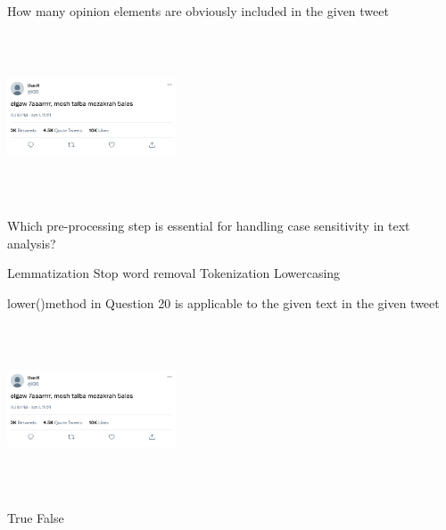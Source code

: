 \documentclass[theme=sleek, randomorder, hidesidemenu]{webquiz}
\begin{document}
\begin{question}
    How many opinion elements are obviously included in the given tweet
  \begin{center}
    \includegraphics[height=50mm, width=50mm]{tweet.png}
  \end{center}
  \begin{choice}[columns=2]
  \end{choice}

\end{question}

\begin{question}
  Which pre-processing step is essential for handling case sensitivity in text analysis?
  \begin{choice}[columns=2]
    \incorrect Lemmatization
    \incorrect Stop word removal
    \incorrect Tokenization
    \correct Lowercasing
  \end{choice}
\end{question}

\begin{question}
lower()method in Question 20 is applicable to the given text in the given tweet
  \begin{center}
    \includegraphics[height=50mm, width=50mm]{tweet.png}
  \end{center}
  \begin{choice}[columns=2]
    \incorrect True
    \correct False
  \end{choice}
\end{question}
\end{document}
